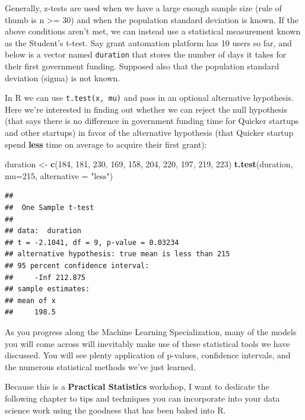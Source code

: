 \documentclass[]{article}
\newenvironment{Shaded}{\begin{snugshade}}{\end{snugshade}}
\newcommand{\DataTypeTok}[1]{\textcolor[rgb]{0.13,0.29,0.53}{#1}}
\newcommand{\DecValTok}[1]{\textcolor[rgb]{0.00,0.00,0.81}{#1}}
\newcommand{\KeywordTok}[1]{\textcolor[rgb]{0.13,0.29,0.53}{\textbf{#1}}}
\newcommand{\NormalTok}[1]{#1}
\newcommand{\StringTok}[1]{\textcolor[rgb]{0.31,0.60,0.02}{#1}}
\begin{document}
Generally, z-tests are used when we have a large enough sample size
(rule of thumb is n \textgreater{}= 30) and when the population standard
deviation is known. If the above conditions aren't met, we can instead
use a statistical measurement known as the Student's t-test. Say grant
automation platform has 10 users so far, and below is a vector named
\texttt{duration} that stores the number of days it takes for their
first government funding. Supposed also that the population standard
deviation (sigma) is not known.

In R we can use \texttt{t.test(x,\ mu)} and pass in an optional
alternative hypothesis. Here we're interested in finding out whether we
can reject the null hypothesis (that says there is no difference in
government funding time for Quicker startups and other startups) in
favor of the alternative hypothesis (that Quicker startup spend
\textbf{less} time on average to acquire their first grant):

\begin{Shaded}
\begin{Highlighting}[]
\NormalTok{duration <-}\StringTok{ }\KeywordTok{c}\NormalTok{(}\DecValTok{184}\NormalTok{, }\DecValTok{181}\NormalTok{, }\DecValTok{230}\NormalTok{, }\DecValTok{169}\NormalTok{, }\DecValTok{158}\NormalTok{, }\DecValTok{204}\NormalTok{, }\DecValTok{220}\NormalTok{, }\DecValTok{197}\NormalTok{, }\DecValTok{219}\NormalTok{, }\DecValTok{223}\NormalTok{)}
\KeywordTok{t.test}\NormalTok{(duration, }\DataTypeTok{mu=}\DecValTok{215}\NormalTok{, }\DataTypeTok{alternative =} \StringTok{"less"}\NormalTok{)}
\end{Highlighting}
\end{Shaded}

\begin{verbatim}
## 
##  One Sample t-test
## 
## data:  duration
## t = -2.1041, df = 9, p-value = 0.03234
## alternative hypothesis: true mean is less than 215
## 95 percent confidence interval:
##     -Inf 212.875
## sample estimates:
## mean of x 
##     198.5
\end{verbatim}

As you progress along the Machine Learning Specialization, many of the
models you will come across will inevitably make use of these
statistical tools we have discussed. You will see plenty application of
p-values, confidence intervals, and the numerous statistical methods
we've just learned.

Because this is a \textbf{Practical Statistics} workshop, I want to
dedicate the following chapter to tips and techniques you can
incorporate into your data science work using the goodness that has been
baked into R.
\end{document}
